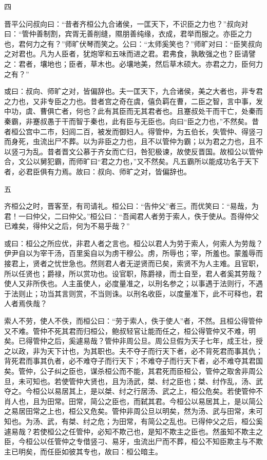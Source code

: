 \documentclass[]{article}
\begin{document}
四

晋平公问叔向曰：``昔者齐桓公九合诸侯，一匡天下，不识臣之力也？''叔向对曰：``管仲善制割，宾胥无善削缝，隰朋善纯缘，衣成，君举而服之。亦臣之力也，君何力之有？''师旷伏琴而笑之。公曰：``太师奚笑也？''师旷对曰：``臣笑叔向之对君也。凡为人臣者，犹炮宰和五味而进之君。君弗食，孰敢强之也？臣请譬之：君者，壤地也；臣者，草木也。必壤地美，然后草木硕大。亦君之力，臣何力之有？''

或曰：叔向、师旷之对，皆偏辞也。夫一匡天下，九合诸侯，美之大者也，非专君之力也，又非专臣之力也。昔者宫之奇在虞，僖负羁在曹，二臣之智，言中事，发中功，虞、曹俱亡者，何也？此有其臣而无其君者也。且蹇叔处干而干亡，处秦而秦霸，非蹇叔愚于干而智于秦也，此有臣与无臣也。向曰``臣之力也，''不然矣。昔者桓公宫中二市，妇闾二百，被发而御妇人。得管仲，为五伯长，失管仲、得竖刁而身死，虫流出尸不葬。以为非臣之力也，且不以管仲为霸；以为君之力也，且不以竖刁为乱。昔者晋文公慕于齐女而亡归，咎犯极谏，故使反晋国。故桓公以管仲合，文公以舅犯霸，而师旷曰``君之力也，''又不然矣。凡五霸所以能成功名于天下者，必君臣俱有力焉。故曰：叔向、师旷之对，皆偏辞也。

五

齐桓公之时，晋客至，有司请礼。桓公曰：``告仲父''者三。而优笑曰：``易哉，为君！一曰仲父，二曰仲父。''桓公曰：``吾闻君人者劳于索人，佚于使从。吾得仲父已难矣，得仲父之后，何为不易乎哉？''

或曰：桓公之所应优，非君人者之言也。桓公以君人为劳于索人，何索人为劳哉？伊尹自以为宰干汤，百里奚自以为虏干穆公。虏，所辱也；宰，所羞也。蒙羞辱而接君上，贤者之忧世急也。然则君人者无逆贤而已矣，索贤不为人主难。且官职，所以任贤也；爵禄，所以赏功也。设官职，陈爵禄，而士自至，君人者奚其劳哉？使人又非所佚也。人主虽使人，必度量准之，以刑名参之；以事遇于法则行，不遇于法则止；功当其言则赏，不当则诛。以刑名收臣，以度量准下，此不可释也，君人者焉佚哉？

索人不劳，使人不佚，而桓公曰：``劳于索人，佚于使人''者，不然。且桓公得管仲又不难。管仲不死其君而归桓公，鲍叔轻官让能而任之，桓公得管仲又不难，明矣。已得管仲之后，奚遽易哉？管仲非周公旦。周公旦假为天子七年，成王壮，授之以政，非为天下计也，为其职也。夫不夺子而行天下者，必不背死君而事其仇；背死君而事其仇者，必不难夺子而行天下；不难夺子而行天下者，必不难夺其君国矣。管仲，公子纠之臣也，谋杀桓公而不能，其君死而臣桓公，管仲之取舍非周公旦，未可知也。若使管仲大贤也，且为汤武，桀、纣之臣也；桀、纣作乱，汤、武夺之。今桓公以易居其上，是以桀、纣之行居汤、武之上，桓公危矣。若使管仲不肖人也，且为田常。田常，简公之臣也，而弑其君。今桓公以易居其上，是以简公之易居田常之上也，桓公又危矣。管仲非周公旦以明矣，然为汤、武与田常，未可知也。为汤、武，有桀、纣之危；为田常，有简公之乱也。已得仲父之后，桓公奚遽易哉？若使桓公之任管仲，必知不欺己也，是知不欺主之臣也。然虽知不欺主之臣，今桓公以任管仲之专借竖刁、易牙，虫流出尸而不葬，桓公不知臣欺主与不欺主已明矣，而任臣如彼其专也，故曰：桓公暗主。
\end{document}
